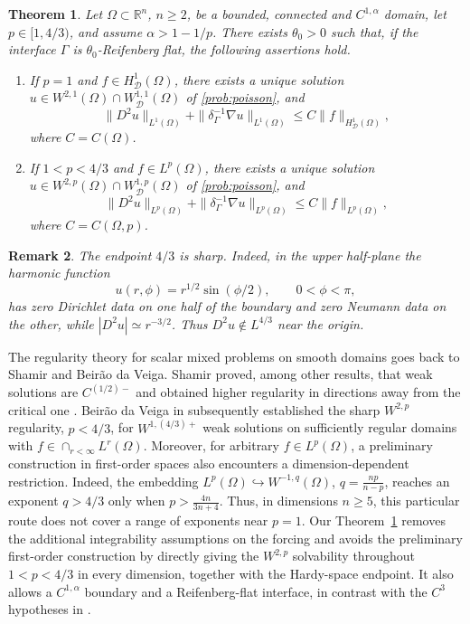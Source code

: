 \documentclass[12pt]{amsart}
\newtheorem{theorem}{Theorem}[section]
\newtheorem{remark}[theorem]{Remark}
\numberwithin{equation}{section}
\newcommand{\bR}{\mathbb{R}}
\newcommand\cD{\mathcal{D}}
\begin{document}
\begin{theorem}
 \label{thm:poisson-smooth}
 Let $\Omega\subset\bR^n$, $n\geq2$, be a bounded, connected and
 $C^{1,\alpha}$ domain, let $p\in[1,4/3)$, and assume
 $\alpha>1-1/p$. There exists $\theta_0>0$ such that, if the interface
 $\Gamma$ is $\theta_0$-Reifenberg flat, the following assertions hold.
 \begin{enumerate}
  \item If $p=1$ and $f\in H^1_{\cD}(\Omega)$, there exists a unique
  solution $u\in W^{2,1}(\Omega)\cap W^{1,1}_{\cD}(\Omega)$ of \eqref{prob:poisson}, and
  \begin{equation}
   \|D^2u\|_{L^1(\Omega)}
   +\|\delta_\Gamma^{-1}\nabla u\|_{L^1(\Omega)}
   \leq C\|f\|_{H^1_{\cD}(\Omega)},
   \label{eq:smooth-hardy-endpoint}
  \end{equation}
  where $C=C(\Omega)$.
  \item If $1<p<4/3$ and $f\in L^p(\Omega)$, there exists a unique
  solution $u\in W^{2,p}(\Omega)\cap W^{1,p}_{\cD}(\Omega)$ of \eqref{prob:poisson},
  and
  \begin{equation}
   \|D^2u\|_{L^p(\Omega)}
   +\|\delta_\Gamma^{-1}\nabla u\|_{L^p(\Omega)}
   \leq C\|f\|_{L^p(\Omega)},
   \label{eq:smooth-Lp-estimate}
  \end{equation}
  where $C=C(\Omega, p)$.
 \end{enumerate}
\end{theorem}
\begin{remark}
    The endpoint $4/3$ is sharp. Indeed, in the upper half-plane the harmonic
function
\[
 u(r,\phi)=r^{1/2}\sin(\phi/2),
 \qquad 0<\phi<\pi,
\]
has zero Dirichlet data on one half of the boundary and zero Neumann data
on the other, while $|D^2u|\simeq r^{-3/2}$. Thus
$D^2u\notin L^{4/3}$ near the origin.
\end{remark}

The regularity theory for scalar mixed problems on smooth domains goes
back to Shamir and Beir\~ao da Veiga. Shamir proved, among other results,
that weak solutions are $C^{(1/2)-}$ and obtained higher regularity in directions away from the critical one \cite{Shamir1968}. 
Beir\~ao da Veiga in \cite[Theorem~B]{MR372410} subsequently established the sharp
$W^{2,p}$ regularity, $p<4/3$, for $W^{1,(4/3)+}$ weak solutions on sufficiently regular domains with $f\in \cap_{r < \infty} L^r(\Omega)$. 
Moreover, for arbitrary $f\in L^p(\Omega)$, a preliminary construction in first-order spaces also encounters a dimension-dependent restriction. Indeed, the embedding $L^p(\Omega)\hookrightarrow W^{-1,q}(\Omega)$, $q=\frac{np}{n-p}$, reaches an exponent $q>4/3$ only when $p>\frac{4n}{3n+4}$.
Thus, in dimensions $n\geq5$, this particular route does not cover a range of exponents near $p=1$.
Our Theorem~\ref{thm:poisson-smooth} removes the additional integrability assumptions on the forcing and avoids the preliminary first-order construction by directly giving the $W^{2,p}$ solvability throughout $1<p<4/3$ in every dimension, together with the Hardy-space endpoint. It also allows a $C^{1,\alpha}$ boundary and a Reifenberg-flat interface, in contrast with the $C^3$ hypotheses in \cite[Theorem~B]{MR372410}.
\end{document}
